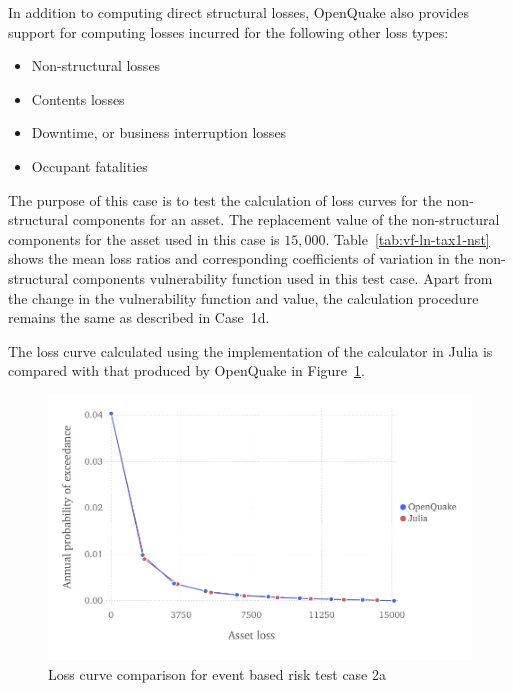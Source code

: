 In addition to computing direct structural losses, OpenQuake also provides support for computing losses incurred for the following other loss types:

\begin{itemize}
\item{Non-structural losses}
\item{Contents losses}
\item{Downtime, or business interruption losses}
\item{Occupant fatalities}
\end{itemize}

The purpose of this case is to test the calculation of loss curves for the non-structural components for an asset. The replacement value of the non-structural components for the asset used in this case is $15,000$. Table~\ref{tab:vf-ln-tax1-nst} shows the mean loss ratios and corresponding coefficients of variation in the non-structural components vulnerability function used in this test case. Apart from the change in the vulnerability function and value, the calculation procedure remains the same as described in Case~1d.

The loss curve calculated using the implementation of the calculator in Julia is compared with that produced by OpenQuake in Figure~\ref{fig:lc-ebr-2a}.

\begin{figure}[htbp]
\centering
\includegraphics[width=12cm]{qareport/figures/fig-lc-ebr-2a}
\caption{Loss curve comparison for event based risk test case 2a}
\label{fig:lc-ebr-2a}
\end{figure}